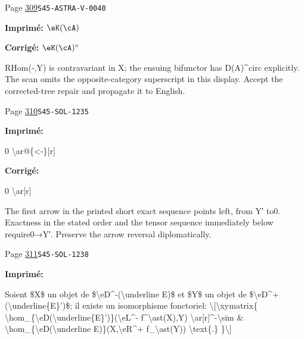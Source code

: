 \begin{description}
\smallskip
\item[\hypertarget{apparatus:FR-0308}{308}] Page \hyperlink{printpage:fr:309}{309}\quad\texttt{S45-ASTRA-V-0040}
\par\noindent\textbf{Imprimé:} \(\eK(\cA)\)
\par\noindent\textbf{Corrigé:} \(\eK(\cA)^\circ\)
\par\noindent RHom(-,Y) is contravariant in X; the ensuing bifunctor has D(A)\textasciicircum{}circ explicitly. The scan omits the opposite-category superscript in this display. Accept the corrected-tree repair and propagate it to English.
\smallskip
\item[\hypertarget{apparatus:FR-0309}{309}] Page \hyperlink{printpage:fr:310}{310}\quad\texttt{S45-SOL-1235}
\par\noindent\textbf{Imprimé:} {\footnotesize\ttfamily\raggedright 0 \textbackslash{}\allowbreak{}ar@\{\allowbreak{}<-\allowbreak{}\}\allowbreak{}[\allowbreak{}r]\allowbreak{}}
\par\noindent\textbf{Corrigé:} {\footnotesize\ttfamily\raggedright 0 \textbackslash{}\allowbreak{}ar[\allowbreak{}r]\allowbreak{}}
\par\noindent The first arrow in the printed short exact sequence points left, from Y′ to0. Exactness in the stated order and the tensor sequence immediately below require0→Y′. Preserve the arrow reversal diplomatically.
\smallskip
\item[\hypertarget{apparatus:FR-0310}{310}] Page \hyperlink{printpage:fr:311}{311}\quad\texttt{S45-SOL-1238}
\par\noindent\textbf{Imprimé:} {\footnotesize\ttfamily\raggedright Soient \$X\$ un objet de \$\textbackslash{}\allowbreak{}eD\textasciicircum{}\allowbreak{}-\allowbreak{}(\allowbreak{}\textbackslash{}\allowbreak{}underline E)\allowbreak{}\$ et \$Y\$ un objet de  \$\textbackslash{}\allowbreak{}eD\textasciicircum{}\allowbreak{}+\allowbreak{}(\allowbreak{}\textbackslash{}\allowbreak{}underline\{\allowbreak{}E\}\allowbreak{}')\allowbreak{}\$; il existe un isomorphisme fonctoriel:  \textbackslash{}\allowbreak{}[\allowbreak{}\textbackslash{}\allowbreak{}xymatrix\{\allowbreak{}   \textbackslash{}\allowbreak{}hom\_\allowbreak{}\{\allowbreak{}\textbackslash{}\allowbreak{}eD(\allowbreak{}\textbackslash{}\allowbreak{}underline\{\allowbreak{}E\}\allowbreak{}')\allowbreak{}\}\allowbreak{}(\allowbreak{}\textbackslash{}\allowbreak{}eL\textasciicircum{}\allowbreak{}-\allowbreak{} f\textasciicircum{}\allowbreak{}\textbackslash{}\allowbreak{}ast(\allowbreak{}X)\allowbreak{},\allowbreak{}Y)\allowbreak{} \textbackslash{}\allowbreak{}ar[\allowbreak{}r]\allowbreak{}\textasciicircum{}\allowbreak{}-\allowbreak{}\textbackslash{}\allowbreak{}sim      \& \textbackslash{}\allowbreak{}hom\_\allowbreak{}\{\allowbreak{}\textbackslash{}\allowbreak{}eD(\allowbreak{}\textbackslash{}\allowbreak{}underline E)\allowbreak{}\}\allowbreak{}(\allowbreak{}X,\allowbreak{}\textbackslash{}\allowbreak{}eR\textasciicircum{}\allowbreak{}+\allowbreak{} f\_\allowbreak{}\textbackslash{}\allowbreak{}ast(\allowbreak{}Y)\allowbreak{})\allowbreak{} \textbackslash{}\allowbreak{}text\{\allowbreak{}.\}\allowbreak{} \}\allowbreak{}\textbackslash{}\allowbreak{}]\allowbreak{}}

\end{description}
